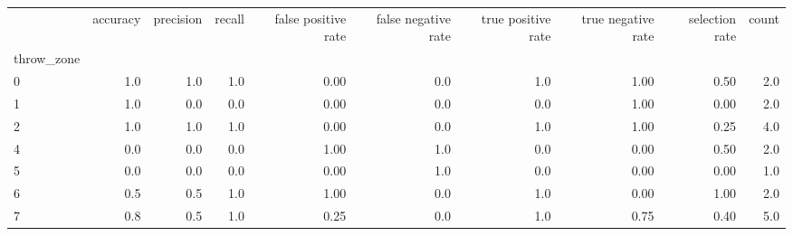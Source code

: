 \begin{tabular}{lrrrrrrrrr}
\toprule
{} &  accuracy &  precision &  recall &  false positive rate &  false negative rate &  true positive rate &  true negative rate &  selection rate &  count \\
throw\_zone &           &            &         &                      &                      &                     &                     &                 &        \\
\midrule
0          &       1.0 &        1.0 &     1.0 &                 0.00 &                  0.0 &                 1.0 &                1.00 &            0.50 &    2.0 \\
1          &       1.0 &        0.0 &     0.0 &                 0.00 &                  0.0 &                 0.0 &                1.00 &            0.00 &    2.0 \\
2          &       1.0 &        1.0 &     1.0 &                 0.00 &                  0.0 &                 1.0 &                1.00 &            0.25 &    4.0 \\
4          &       0.0 &        0.0 &     0.0 &                 1.00 &                  1.0 &                 0.0 &                0.00 &            0.50 &    2.0 \\
5          &       0.0 &        0.0 &     0.0 &                 0.00 &                  1.0 &                 0.0 &                0.00 &            0.00 &    1.0 \\
6          &       0.5 &        0.5 &     1.0 &                 1.00 &                  0.0 &                 1.0 &                0.00 &            1.00 &    2.0 \\
7          &       0.8 &        0.5 &     1.0 &                 0.25 &                  0.0 &                 1.0 &                0.75 &            0.40 &    5.0 \\
\bottomrule
\end{tabular}
